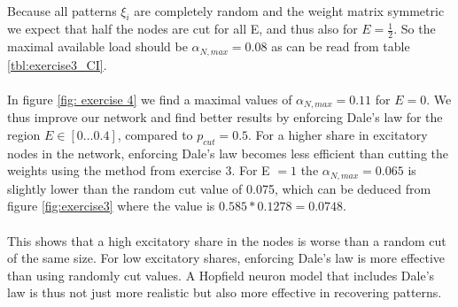 \paragraph*{}
Because all patterns $\xi_i$ are completely random and the weight matrix symmetric we expect that half the nodes are cut for all E, and thus also for $E = \frac{1}{2}$.
So the maximal available load should be $\alpha_{N,max} = 0.08$ as can be read from table \ref{tbl:exercise3_CI}. 

\paragraph*{}
In figure \ref{fig: exercise 4} we find a maximal values of $\alpha_{N,max} = 0.11 $ for $E=0$. We thus improve our network and find better results by enforcing Dale's law for the region $E \in [0 \ldots 0.4]$, compared to $p_{cut} =0.5$. For a higher share in excitatory nodes in the network, enforcing Dale's law becomes less efficient than cutting the weights using the method from exercise 3. For E $ = 1$ the $\alpha_{N,max}=0.065$ is slightly lower than the random cut  value of 0.075, which can be deduced from figure \ref{fig:exercise3} where the value is $0.585*0.1278=0.0748$.

\paragraph*{}
This shows that a high excitatory share in the nodes is worse than a random cut of the same size. For low excitatory shares, enforcing Dale's law is more effective than using randomly cut values. A Hopfield neuron model that includes Dale's law is thus not just more realistic but also more effective in recovering patterns. 


	